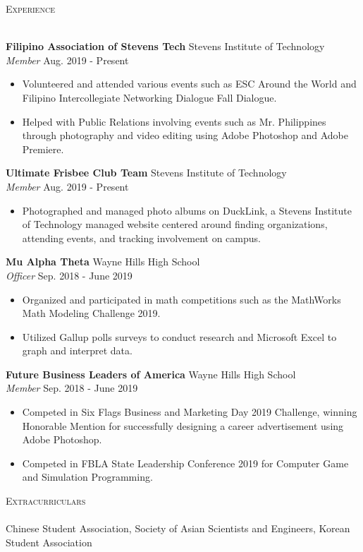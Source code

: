 \documentclass[11pt]{article}
\newcommand{\lineunder} {
    \vspace*{-8pt} \\
    \hspace*{-18pt} \hrulefill \\
}
\newcommand{\header} [1] {
    {\hspace*{-18pt}\vspace*{6pt} \textsc{#1}}
    \vspace*{-6pt} \lineunder
}
\begin{document}
\header{Experience}
\vspace{1mm}

\textbf{Filipino Association of Stevens Tech} \hfill Stevens Institute of Technology\\
\textit{Member} \hfill Aug. 2019 - Present\\
\vspace{-1mm}
\begin{itemize} \itemsep 1pt
	\item Volunteered and attended various events such as ESC Around the World and Filipino Intercollegiate Networking Dialogue Fall Dialogue.
	\item Helped with Public Relations involving events such as Mr. Philippines through photography and video editing using Adobe Photoshop and Adobe Premiere.
\end{itemize}

\textbf{Ultimate Frisbee Club Team} \hfill Stevens Institute of Technology\\
\textit{Member} \hfill Aug. 2019 - Present\\
\vspace{-1mm}
\begin{itemize} \itemsep 1pt
	\item Photographed and managed photo albums on DuckLink, a Stevens Institute of Technology managed website centered around finding organizations, attending events, and tracking involvement on campus.
\end{itemize}

\textbf{Mu Alpha Theta} \hfill Wayne Hills High School\\
\textit{Officer} \hfill Sep. 2018 - June 2019\\
\vspace{-1mm}
\begin{itemize} \itemsep 1pt
	\item Organized and participated in math competitions such as the MathWorks Math Modeling Challenge 2019.
	\item Utilized Gallup polls surveys to conduct research and Microsoft Excel to graph and interpret data.
\end{itemize}

\textbf{Future Business Leaders of America} \hfill Wayne Hills High School\\
\textit{Member} \hfill Sep. 2018 - June 2019\\
\vspace{-1mm}
\begin{itemize}  \itemsep 1pt
	\item Competed in Six Flags Business and Marketing Day 2019 Challenge, winning Honorable Mention for successfully designing a career advertisement using Adobe Photoshop.
	\item Competed in FBLA State Leadership Conference 2019 for Computer Game and Simulation Programming.
\end{itemize}

\header{Extracurriculars}
Chinese Student Association, Society of Asian Scientists and Engineers, Korean Student Association
\end{document}
